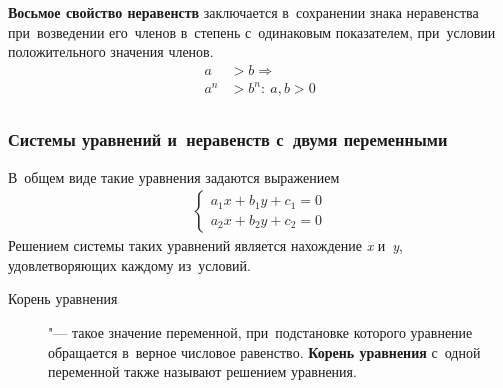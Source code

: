 \documentclass[]{scrartcl}
\begin{document}
\textbf{Восьмое свойство неравенств} заключается в~сохранении знака неравенства при~возведении его~членов в~степень с~одинаковым показателем, при~условии положительного значения членов.
\begin{equation}\label{eq:enequalities-property8}
\begin{aligned}
a&>b \Rightarrow\\
a^n&>b^n:\ a,b>0\\
\end{aligned}
\end{equation}

\subsubsection{Системы уравнений и~неравенств с~двумя переменными}\label{two-unknown-system}

В~общем виде такие уравнения задаются выражением
\begin{equation}\label{eq:systems-linear-equations}
\begin{aligned}
\begin{cases}
a_{1}x+b_{1}y+c_{1}=0\\
a_{2}x+b_{2}y+c_{2}=0
\end{cases}
\end{aligned}
\end{equation}
Решением системы таких уравнений является нахождение \textit{x} и~\textit{y}, удовлетворяющих каждому из~условий. 
\begin{description}
	\item[Корень уравнения] "--- такое значение переменной, при~подстановке которого уравнение обращается в~верное числовое равенство. \textbf{Корень уравнения} с~одной переменной также называют решением уравнения.
\end{description}
\end{document}

